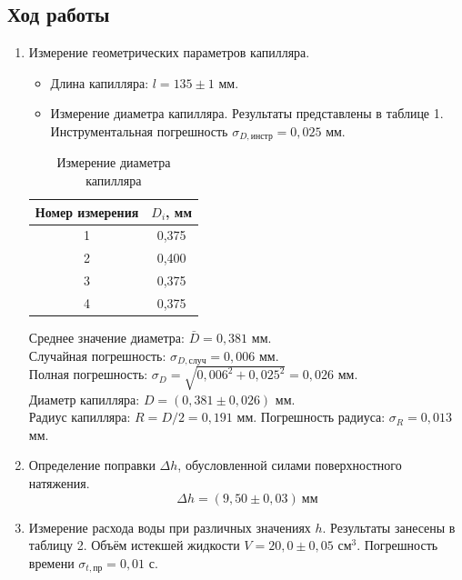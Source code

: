\documentclass[a4paper]{article}
\begin{document}
\subsection{Ход работы}
\begin{enumerate}
    \item Измерение геометрических параметров капилляра.
    \begin{itemize}
        \item Длина капилляра: $l = 135 \pm 1$ мм.
        \item Измерение диаметра капилляра. Результаты представлены в таблице 1. Инструментальная погрешность $\sigma_{D,\text{инстр}} = 0,025$ мм.
    \end{itemize}

    \begin{table}[h]
        \centering
        \caption{Измерение диаметра капилляра}
        \label{tab:diam}
        \begin{tabular}{|c|c|}
        \hline
        Номер измерения & $D_i$, мм \\
        \hline
        1 & 0,375 \\
        2 & 0,400 \\
        3 & 0,375 \\
        4 & 0,375 \\
        \hline
        \end{tabular}
    \end{table}

    Среднее значение диаметра: $\bar D = 0,381$ мм. \\
    Случайная погрешность: $\sigma_{D,\text{случ}} = 0,006$ мм. \\
    Полная погрешность: $\sigma_D = \sqrt{0,006^2 + 0,025^2} = 0,026$ мм. \\
    Диаметр капилляра: $D = (0,381 \pm 0,026)$ мм. \\
    Радиус капилляра: $R = D/2 = 0,191$ мм. Погрешность радиуса: $\sigma_R = 0,013$ мм.

    \item Определение поправки $\Delta h$, обусловленной силами поверхностного натяжения.
    $$\Delta h = (9,50 \pm 0,03)\ \text{мм}$$

    \item Измерение расхода воды при различных значениях $h$. Результаты занесены в таблицу 2. Объём истекшей жидкости $V = 20,0 \pm 0,05$ см$^3$. Погрешность времени $\sigma_{t,\text{пр}} = 0,01$ с.


\end{enumerate}
\end{document}
